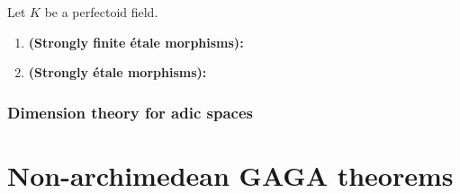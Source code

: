                     \begin{definition} \label{def: strongly_finite_etale_morphisms_of_adic_spaces}
                        Let $K$ be a perfectoid field.
                            \begin{enumerate}
                                \item \textbf{(Strongly finite \'etale morphisms):} 
                                \item \textbf{(Strongly \'etale morphisms):}
                            \end{enumerate}
                    \end{definition}
            
            \subsubsection{Dimension theory for adic spaces}
            
    \section{Non-archimedean GAGA theorems}
                